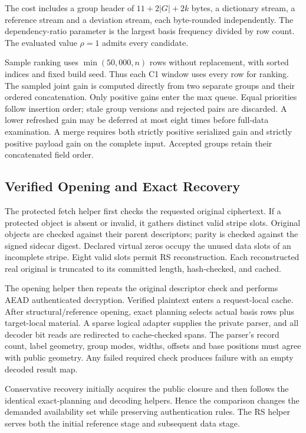 \documentclass[10pt,journal,onecolumn]{IEEEtran}
\begin{document}
The cost includes a group header of $11+2|G|+2k$ bytes, a dictionary stream,
a reference stream and a deviation stream, each byte-rounded independently.
The dependency-ratio parameter is the largest basis frequency divided by
row count. The evaluated value $\rho=1$ admits every candidate.

Sample ranking uses $\min(50{,}000,n)$ rows without replacement, with sorted
indices and fixed build seed. Thus each C1 window uses every row for ranking.
The sampled joint gain is computed directly from two separate groups and
their ordered concatenation. Only positive gains enter the max queue.
Equal priorities follow insertion order; stale group versions and rejected
pairs are discarded. A lower refreshed gain may be deferred at most eight
times before full-data examination. A merge requires both strictly positive
serialized gain and strictly positive payload gain on the complete input.
Accepted groups retain their concatenated field order.

\subsection{Verified Opening and Exact Recovery}
The protected fetch helper first checks the requested original ciphertext.
If a protected object is absent or invalid, it gathers distinct valid stripe
slots. Original objects are checked against their parent descriptors; parity
is checked against the signed sidecar digest. Declared virtual zeros occupy
the unused data slots of an incomplete stripe. Eight valid slots permit RS
reconstruction. Each reconstructed real original is truncated to its committed
length, hash-checked, and cached.

The opening helper then repeats the original descriptor check and performs
AEAD authenticated decryption. Verified plaintext enters a request-local
cache. After structural/reference opening, exact planning selects actual
basis rows plus target-local material. A sparse logical adapter supplies the
private parser, and all decoder bit reads are redirected to cache-checked
spans. The parser's record count, label geometry, group modes, widths, offsets
and base positions must agree with public geometry. Any failed required
check produces failure with an empty decoded result map.

Conservative recovery initially acquires the public closure and then follows
the identical exact-planning and decoding helpers. Hence the comparison
changes the demanded availability set while preserving authentication rules.
The RS helper serves both the initial reference stage and subsequent data stage.
\end{document}
